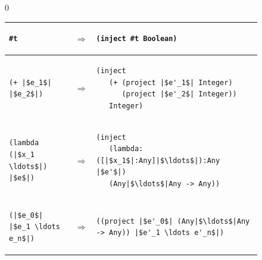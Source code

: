 \documentclass[7x10]{TimesAPriori_MIT}%
\def\racketEd{0}
\providecommand{\BookEdition}{1}
\let\edition\BookEdition
\numberwithin{theorem}{chapter}
\numberwithin{definition}{chapter}
\numberwithin{equation}{chapter}
\begin{document}
\begin{figure}[btp]
\centering
  \begin{tcolorbox}[colback=white]
{\if\edition\racketEd
\begin{tabular}{lll}
\begin{minipage}{0.27\textwidth}
\begin{lstlisting}
#t
\end{lstlisting}
\end{minipage}
&
$\Rightarrow$
&
\begin{minipage}{0.65\textwidth}
\begin{lstlisting}
(inject #t Boolean)
\end{lstlisting}
\end{minipage}
\\[2ex]\hline
\begin{minipage}{0.27\textwidth}
\begin{lstlisting}
(+ |$e_1$| |$e_2$|)
\end{lstlisting}
\end{minipage}
&
$\Rightarrow$
&
\begin{minipage}{0.65\textwidth}
\begin{lstlisting}
(inject
   (+ (project |$e'_1$| Integer)
      (project |$e'_2$| Integer))
   Integer)
\end{lstlisting}
\end{minipage}
\\[2ex]\hline
\begin{minipage}{0.27\textwidth}
\begin{lstlisting}
(lambda (|$x_1 \ldots$|) |$e$|)
\end{lstlisting}
\end{minipage}
&
$\Rightarrow$
&
\begin{minipage}{0.65\textwidth}
\begin{lstlisting}
(inject
   (lambda: ([|$x_1$|:Any]|$\ldots$|):Any |$e'$|)
   (Any|$\ldots$|Any -> Any))
\end{lstlisting}
\end{minipage}
\\[2ex]\hline
\begin{minipage}{0.27\textwidth}
\begin{lstlisting}
(|$e_0$| |$e_1 \ldots e_n$|)
\end{lstlisting}
\end{minipage}
&
$\Rightarrow$
&
\begin{minipage}{0.65\textwidth}
\begin{lstlisting}
((project |$e'_0$| (Any|$\ldots$|Any -> Any)) |$e'_1 \ldots e'_n$|)

\end{lstlisting}
\end{minipage}
\end{tabular}}
\end{tcolorbox}
\end{figure}
\end{document}
